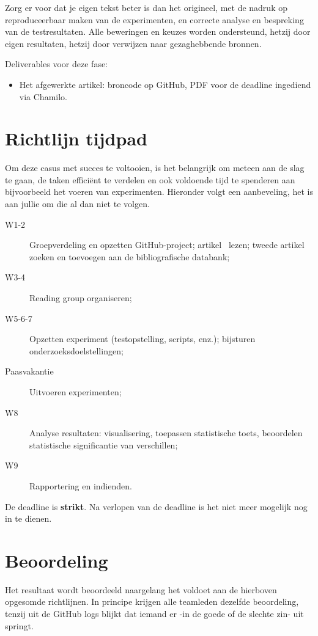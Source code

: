 \documentclass[fleqn,10pt]{voorstel}
\begin{document}
Zorg er voor dat je eigen tekst beter is dan het origineel, met de nadruk op reproduceerbaar maken van de experimenten, en correcte analyse en bespreking van de testresultaten. Alle beweringen en keuzes worden ondersteund, hetzij door eigen resultaten, hetzij door verwijzen naar gezaghebbende bronnen.

Deliverables voor deze fase:

\begin{itemize}
  \item Het afgewerkte artikel: broncode op GitHub, PDF voor de deadline ingediend via Chamilo.
\end{itemize}

\section{Richtlijn tijdpad}

Om deze casus met succes te voltooien, is het belangrijk om meteen aan de slag te gaan, de taken efficiënt te verdelen en ook voldoende tijd te spenderen aan bijvoorbeeld het voeren van experimenten. Hieronder volgt een aanbeveling, het is aan jullie om die al dan niet te volgen.

\begin{description}
	\item[W1-2] Groepverdeling en opzetten GitHub-project; artikel~\textcite{Bassil2012} lezen; tweede artikel zoeken en toevoegen aan de bibliografische databank;
	\item[W3-4] Reading group organiseren;
	\item[W5-6-7] Opzetten experiment (testopstelling, scripts, enz.); bijsturen onderzoeksdoelstellingen;
	\item[Paasvakantie] Uitvoeren experimenten;
	\item[W8] Analyse resultaten: visualisering, toepassen statistische toets, beoordelen statistische significantie van verschillen;
	\item[W9] Rapportering en indienden.
\end{description}

De deadline is \textbf{strikt}. Na verlopen van de deadline is het niet meer mogelijk nog in te dienen.

\section{Beoordeling}

Het resultaat wordt beoordeeld naargelang het voldoet aan de hierboven opgesomde richtlijnen. In principe krijgen alle teamleden dezelfde beoordeling, tenzij uit de GitHub logs blijkt dat iemand er -in de goede of de slechte zin- uit springt.
\end{document}
